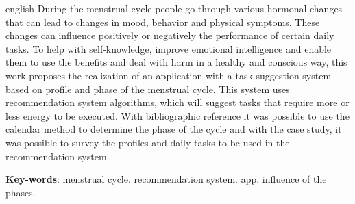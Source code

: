 \begin{resumo}[Abstract]
  \begin{otherlanguage*}{english}
   During the menstrual cycle people go through various hormonal changes that can lead to
 changes in mood, behavior and physical symptoms. These changes can influence
 positively or negatively the performance of certain daily tasks. To help with self-knowledge, improve emotional intelligence and enable them to use the benefits and deal with
 harm in a healthy and conscious way, this work proposes the realization of an application with a task suggestion system based on
 profile and phase of the menstrual cycle. This system uses recommendation system algorithms, which will suggest tasks
 that require more or less energy to be executed. With bibliographic reference
 it was possible to use the calendar method to determine the phase of the cycle and with the
 case study, it was possible to survey the profiles and daily tasks to be used in the
 recommendation system.
 
    \vspace{\onelineskip}
  
    \noindent 
    \textbf{Key-words}: 
    menstrual cycle. recommendation system. app. influence of the phases.
  \end{otherlanguage*}
 \end{resumo}
 